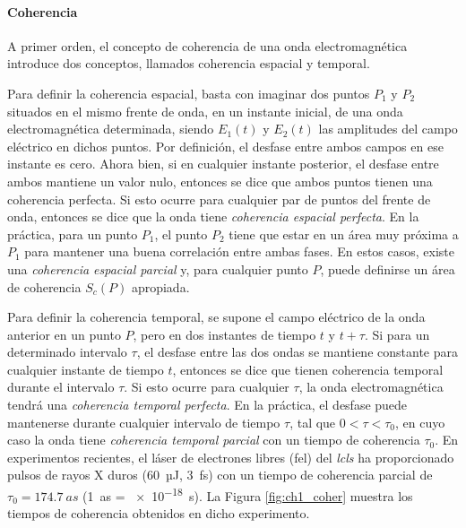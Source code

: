 \paragraph{Coherencia}\label{par:1.1.2.2}
A primer orden, el concepto de coherencia de una onda electromagnética introduce dos conceptos, llamados coherencia espacial y temporal\autocite{Svelto2010}.

Para definir la coherencia espacial, basta con imaginar dos puntos $P_1$ y $P_2$ situados en el mismo frente de onda, en un instante inicial, de una onda electromagnética determinada, siendo $E_1(t)$ y $E_2(t)$ las amplitudes del campo eléctrico en dichos puntos. Por definición, el desfase entre ambos campos en ese instante es cero. Ahora bien, si en cualquier instante posterior, el desfase entre ambos mantiene un valor nulo, entonces se dice que ambos puntos tienen una coherencia perfecta. Si esto ocurre para cualquier par de puntos del frente de onda, entonces se dice que la onda tiene \emph{coherencia espacial perfecta}. En la práctica, para un punto $P_1$, el punto $P_2$ tiene que estar en un área muy próxima a $P_1$ para mantener una buena correlación entre ambas fases. En estos casos, existe una \emph{coherencia espacial parcial} y, para cualquier punto $P$, puede definirse un área de coherencia $S_{c}(P)$ apropiada.

Para definir la coherencia temporal, se supone el campo eléctrico de la onda anterior en un punto $P$, pero en dos instantes de tiempo $t$ y $t+\tau$. Si para un determinado intervalo $\tau$, el desfase entre las dos ondas se mantiene constante para cualquier instante de tiempo $t$, entonces se dice que tienen coherencia temporal durante el intervalo $\tau$. Si esto ocurre para cualquier $\tau$, la onda electromagnética tendrá una \emph{coherencia temporal perfecta}. En la práctica, el desfase puede mantenerse durante cualquier intervalo de tiempo $\tau$, tal que $0<\tau<\tau_0$, en cuyo caso la onda tiene \emph{coherencia temporal parcial} con un tiempo de coherencia $\tau_0$. En experimentos recientes\autocite{Zhou2020}, el láser de electrones libres (\acrshort{fel}) del \emph{\acrfull{lcls}} ha proporcionado pulsos de rayos X duros (\qty{60}{µJ}, \qty{3}{fs}) con un tiempo de coherencia parcial de $\tau_0 = \qty{174,7}{as}$ (\qty{1}{as} = \qty{e-18}{s}). La Figura \ref{fig:ch1_coher} muestra los tiempos de coherencia obtenidos en dicho experimento. 

